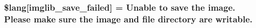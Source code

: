 \subsubsection[{\$lang}]{\setlength{\rightskip}{0pt plus 5cm}\$lang\mbox{[}\textquotesingle{}imglib\+\_\+save\+\_\+failed\textquotesingle{}\mbox{]} = \textquotesingle{}Unable to save the image. Please make sure the image and file directory are writable.\textquotesingle{}}\label{system_2language_2english_2imglib__lang_8php_a4d7a99fddc60c97a7327fa0125dea264}
